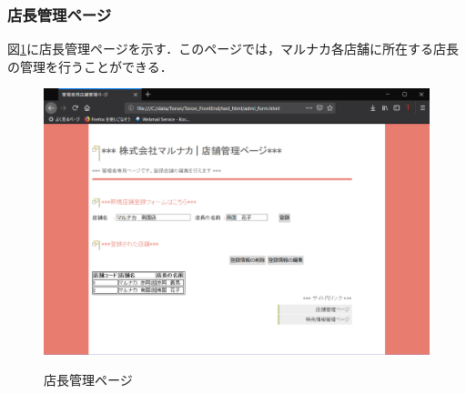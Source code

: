 \documentclass[a4j]{jarticle}
\begin{document}
\subsubsection{店長管理ページ}
図\ref{tentyou1}に店長管理ページを示す．このページでは，マルナカ各店舗に所在する店長の管理を行うことができる．
\begin{figure}[H]
  \begin{center}
    \includegraphics[width=15cm]{tentyou1.png}\\
    \caption{店長管理ページ}
    \label{tentyou1}
  \end{center}
\end{figure}
\end{document}
